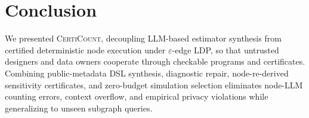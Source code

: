 \documentclass[conference]{IEEEtran}
\theoremstyle{ieeeitalic}
\begin{document}
\section{Conclusion}
\label{sec:conclusion}

We presented \textsc{CertiCount}, decoupling LLM-based estimator synthesis from certified deterministic node execution under $\varepsilon$-edge LDP, so that untrusted designers and data owners cooperate through checkable programs and certificates. Combining public-metadata DSL synthesis, diagnostic repair, node-re-derived sensitivity certificates, and zero-budget simulation selection eliminates node-LLM counting errors, context overflow, and empirical privacy violations while generalizing to unseen subgraph queries.



\end{document}
